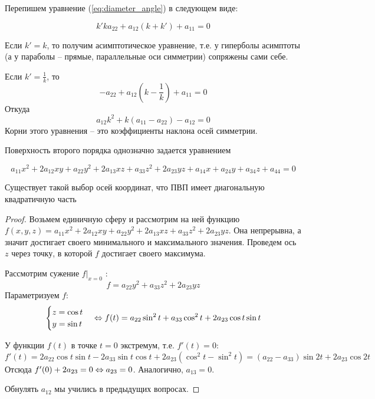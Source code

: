 \begin{Rem}
	Перепишем уравнение (\ref{eq:diameter_angle}) в следующем виде:

	\[k'k a_{22} + a_{12}(k + k') + a_{11} = 0\]	

	\begin{MyItemize}
		\item Если $k' = k$, то получим асимптотическое уравнение, т.е. у гиперболы асимптоты (а у параболы -- прямые, параллельные оси симметрии) сопряжены сами себе.
		\item Если $k' = \frac{1}{k}$, то
		\[-a_{22} + a_{12} \left(k - \frac{1}{k}\right)+ a_{11} = 0 \]
		Откуда
		\[a_{12} k^2 + k(a_{11} - a_{22}) - a_{12} = 0\]
		Корни этого уравнения -- это коэффициенты наклона осей симметрии.
	\end{MyItemize}
\end{Rem}


Поверхность второго порядка однозначно задается уравнением

\[a_{11} x^2 + 2a_{12} xy + a_{22} y^2 + 2a_{13} xz + a_{33} z^2 + 2a_{23} yz + a_{14} x + a_{24} y + a_{34} z + a_{44} = 0\]

\begin{Thm}
	Существует такой выбор осей координат, что ПВП имеет диагональную квадратичную часть
\end{Thm}

\begin{proof}
	Возьмем единичную сферу и рассмотрим на ней функцию $f(x, y, z) = a_{11} x^2 + 2a_{12} xy + a_{22} y^2 + 2a_{13} xz + a_{33} z^2 + 2a_{23} yz$.
	Она непрерывна, а значит достигает своего минимального и максимального значения. Проведем ось $z$ через точку, в которой $f$ достигает своего максимума.

	Рассмотрим сужение $f|_{x = 0}$ :
	\[f = a_{22} y^2 + a_{33} z^2 + 2a_{23} yz\]
	Параметризуем $f$:
	\[\begin{cases}
		z = \cos t \\
		y = \sin t
	\end{cases} \Leftrightarrow f(t) = a_{22} \sin^2 t + a_{33} \cos^2 t + 2a_{23} \cos t \sin t\]

	У функции $f(t)$ в точке $t = 0$ экстремум, т.е. $f'(t) = 0$:
	\[f'(t) = 2a_{22} \cos t \sin t - 2a_{33} \sin t \cos t + 2a_{23} (\cos^2 t - \sin^2 t) = (a_{22} - a_{33})\sin 2t + 2a_{23} \cos 2t\]
	Отсюда $f'(0) + 2a_{23} = 0 \Leftrightarrow a_{23} = 0$. Аналогично, $a_{13} = 0$.

	Обнулять $a_{12}$ мы учились в предыдущих вопросах.
\end{proof}

